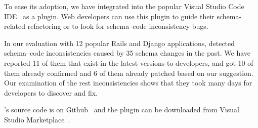 


To ease its adoption, we have integrated \ETool into the popular 
Visual Studio Code IDE~\cite{vscodepop} as a plugin. Web developers can use this plugin to
guide their schema-related refactoring or to look for
schema--code inconsistency bugs.

In our evaluation with 12 popular Rails and Django applications, 
\ETool detected \numRailsError schema--code inconsistencies 
caused by 35 schema changes in the past.
We have reported 11 of them that exist in the latest versions to developers,
and got 10 of them already confirmed and 6 of them already patched based on
our suggestion.
Our examination of the rest \numFixed inconsistencies shows that 
they took many days for developers
to discover and fix.

\ETool's source code is on Github~\cite{sourcecode} and the plugin can be downloaded from Visual Studio Marketplace~\cite{vscodemarketplace}.

